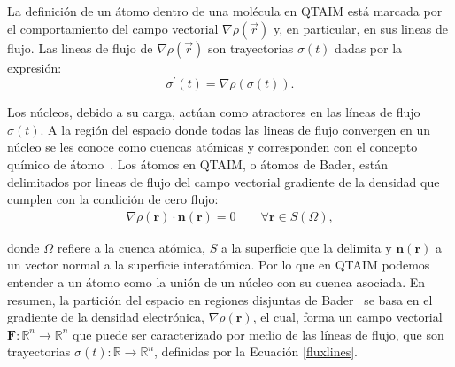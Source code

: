 La definición de un átomo dentro de una molécula en QTAIM está marcada por el
comportamiento del campo vectorial $\nabla\rho(\vec{r})$ y, en particular, en
sus lineas de flujo. Las lineas de flujo de $\nabla\rho(\vec{r})$ son
trayectorias $\sigma(t)$ dadas por la expresión:
\begin{equation}
  \sigma^{\prime}(t) = \nabla\rho\left( \sigma(t)\right) .
  \label{fluxlines}
\end{equation}

Los núcleos, debido a su carga, actúan como atractores en las líneas de flujo
$\sigma(t)$. A la región del espacio donde todas las lineas de flujo convergen
en un núcleo se les conoce como cuencas atómicas y corresponden con el concepto
químico de átomo~\cite{bader}. Los átomos en QTAIM, o átomos de Bader, están
delimitados por lineas de flujo del campo vectorial gradiente de la densidad
que cumplen con la condición de cero flujo:
\begin{align}
  \nabla\rho(\mathbf{r})\cdot\mathbf{n(r)} = 0 \qquad \forall\mathbf{r}\in S(\Omega),
  \label{cero_f}
\end{align}
%

\noindent donde $\Omega$ refiere a la cuenca atómica, $S$ a la superficie que
la delimita y $\mathbf{n}(\mathbf{r})$ a un vector normal a la superficie
interatómica. Por lo que en QTAIM podemos entender a un átomo como la unión de
un núcleo con su cuenca asociada.
En resumen, la partición del espacio en regiones disjuntas de
Bader~\cite{bader} se basa en el gradiente de la densidad electrónica, $\nabla
\rho(\mathbf{r})$, el cual, forma un campo vectorial $\mathbf{F}:\mathbb{R}^{n}
\to \mathbb{R}^{n}$ que puede ser caracterizado por medio de las líneas de
flujo, que son  trayectorias $\sigma(t):\mathbb{R} \to \mathbb{R}^{n}$,
definidas por la Ecuación \ref{fluxlines}.  

